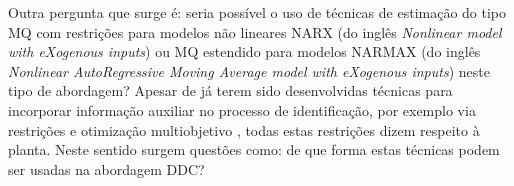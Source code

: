 	Outra pergunta que surge é: seria possível o uso de técnicas de estimação do tipo MQ com restrições para modelos não lineares NARX (do inglês \emph{Nonlinear model with eXogenous inputs}) ou MQ estendido para modelos NARMAX (do inglês \emph{Nonlinear AutoRegressive Moving Average model with eXogenous inputs}) neste tipo de abordagem?
	Apesar de já terem sido desenvolvidas técnicas para incorporar informação auxiliar no processo de identificação, por exemplo via restrições e otimização multiobjetivo \citep{barroso2006}, todas estas restrições dizem respeito à planta.
	Neste sentido surgem questões como: de que forma estas técnicas podem ser usadas na abordagem DDC?








